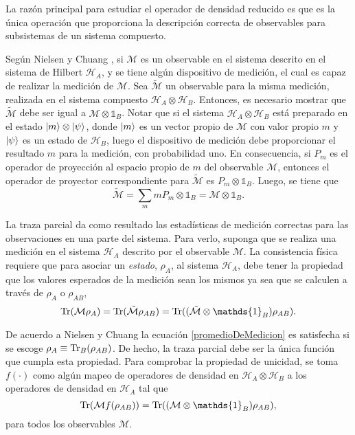 La razón principal para estudiar el operador de densidad reducido es que es la única operación que proporciona la descripción correcta de observables para subsistemas de un sistema compuesto. 

Según Nielsen y Chuang {\cite{nielsen_chuang_2010}}, si  $\mathcal{M}$ es un
observable en el sistema descrito en el sistema de Hilbert $\mathcal{H}_A$, y
se tiene algún dispositivo de medición, el cual es capaz de realizar la
medición de $\mathcal{M}$. Sea $\tilde{\mathcal{M}}$ un observable para la
misma medición, realizada en el sistema compuesto $\mathcal{H}_A\otimes
\mathcal{H}_B$. Entonces, es necesario mostrar que $\tilde{\mathcal{M}}$ debe
ser igual a $\mathcal{M}\otimes \mathds{1}_B$. Notar que si el sistema
$\mathcal{H}_A\otimes \mathcal{H}_B$ está preparado en el estado $|m \rangle
\otimes|\psi\rangle $, donde $|m\rangle $ es un vector propio de $\mathcal{M}$ con
valor propio $m$ y $|\psi\rangle$ es un estado de $\mathcal{H}_B$, luego el
dispositivo de medición debe proporcionar  el resultado $m$ para la medición,
con probabilidad uno. En consecuencia, si $P_m$ es el operador de proyección al
espacio propio de $m$ del observable $\mathcal{M}$, entonces el operador de
proyector correspondiente para $\tilde{\mathcal{M}}$ es $P_m\otimes
\mathds{1}_B$. Luego, se tiene que \[\mathcal{\tilde{M}}=\sum_m mP_m\otimes
\mathds{1}_B=\mathcal{M}\otimes \mathds{1}_B.\]

La traza parcial da como resultado las estadísticas de medición correctas para
las observaciones en una parte del sistema. Para verlo, suponga que se realiza
una medición en el sistema $\mathcal{H}_A$ descrito por el observable
$\mathcal{M}$. La consistencia física requiere que  para asociar un
\textit{estado}, $\rho_A$, al sistema $\mathcal{H}_A$, debe tener la propiedad
que los valores esperados de la medición sean los mismos ya sea que se calculen
a través de $\rho_A$ o $\rho_{AB}$, {\cite{nielsen_chuang_2010}}
\begin{equation}\label{promedioDeMedicion}\tr(\mathcal{M}\rho_A)=\tr(\mathcal{\tilde{M}}\rho_{AB})=\tr((\mathcal{\tilde{M}}\otimes
\mathds{1}_B)\rho_{AB}).\end{equation} 

De acuerdo a Nielsen y Chuang {\cite{nielsen_chuang_2010}} la ecuación
{\ref{promedioDeMedicion}} es satisfecha si se escoge $\rho_A\equiv {\rm Tr}_B(\rho
_{AB})$. De hecho, la traza parcial debe ser la única función que cumpla esta
propiedad. Para comprobar la propiedad de unicidad, se toma  $f(\cdot)$ como
algún mapeo de operadores de densidad en $\mathcal{H}_A\otimes \mathcal{H}_B$ a
los operadores de densidad en $\mathcal{H}_A$ tal que \[\tr(\mathcal{M}
f(\rho_{AB} )) = \tr((\mathcal{M}\otimes \mathds{1}_B )\rho_{AB} ),\] para
todos los observables $\mathcal{M}$. 

